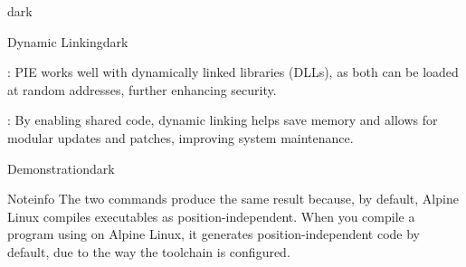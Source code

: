 \begin{baseBoxThree}{}{dark}
    \smallskip
    \begin{baseBoxThree}{Dynamic Linking}{dark}
        \begin{posnexItemize}
            \item[\sA] : PIE works well with dynamically linked libraries (DLLs), as both can be loaded at random addresses, further enhancing security.
            \item[\sA] : By enabling shared code, dynamic linking helps save memory and allows for modular updates and patches, improving system maintenance.
        \end{posnexItemize}
    \end{baseBoxThree}
    \smallskip
    \begin{baseBoxThree}{Demonstration}{dark}
    \end{baseBoxThree}
    \smallskip
    \begin{baseBoxThree}{Note}{info}
        \smallskip
            The two commands produce the same result because, by default, Alpine Linux compiles executables as position-independent.
            When you compile a program using  on Alpine Linux, it generates position-independent code by default, due to the way the toolchain is configured.
        \smallskip
    \end{baseBoxThree}
    \smallskip
\end{baseBoxThree}

